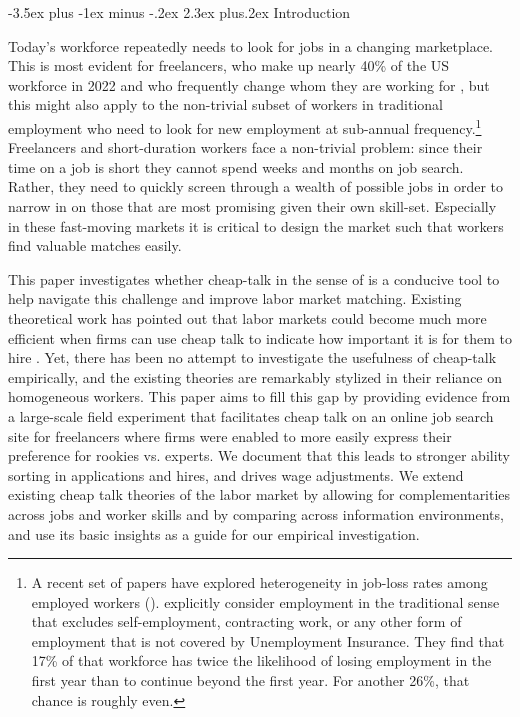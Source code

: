 \documentclass[12pt]{article}
\makeatletter
\renewcommand{\section}{%
  \@startsection{section}{1}{\z@}%
  {-3.5ex plus -1ex minus -.2ex}%
  {2.3ex plus.2ex}%
  {\normalfont\Large\bfseries}%
}
\makeatother
\begin{document}

\onehalfspacing

\section{Introduction}

 Today's workforce repeatedly needs to look for jobs in a changing marketplace. This is most evident for freelancers, who make up nearly 40\% of the US workforce in 2022 and who frequently change whom they are working for \citep{Bloomberg2022}, but this might also apply to the non-trivial subset of workers in traditional employment who need to look for new employment at sub-annual frequency.\footnote{A recent set of papers have explored heterogeneity in job-loss rates among employed workers (\cite{hall2022unemployed,ahn2023dual,gregory2021alpha}). \cite{gregory2021alpha} explicitly consider employment in the traditional sense that excludes self-employment, contracting work, or any other form of employment that
is not covered by Unemployment Insurance. They find that 17\% of that workforce has twice the likelihood of losing employment in the first year than to continue beyond the first year. For another 26\%, that chance is roughly even.} Freelancers and short-duration workers face a non-trivial problem: since their time on a job is short they cannot spend weeks and months on job search. Rather, they need to quickly screen through a wealth of possible jobs in order to narrow in on those that are most promising given their own skill-set. Especially in these fast-moving markets it is critical to design the market such that workers find valuable matches easily. 


 
 This paper investigates whether cheap-talk in the sense of \cite{crawford1982strategic} is a conducive tool to help navigate this challenge and improve labor market matching. Existing theoretical work has pointed out that labor markets could become much more efficient when firms can use cheap talk to indicate how important it is for them to hire \citep{menzio2007theory, kimKircher2015}. Yet, there has been no attempt to investigate the usefulness of cheap-talk empirically, and the existing theories are remarkably stylized in their reliance on homogeneous workers. This paper aims to fill this gap by providing evidence from a large-scale field experiment that facilitates cheap talk on an online job search site for freelancers where firms were enabled to more easily express their preference for rookies vs. experts. We document that this leads to stronger ability sorting in applications and hires, and drives wage adjustments. We extend existing cheap talk theories of the labor market by allowing for complementarities across jobs and worker skills and by comparing across information environments, and use its basic insights as a guide for our empirical investigation. 
 
\end{document}
